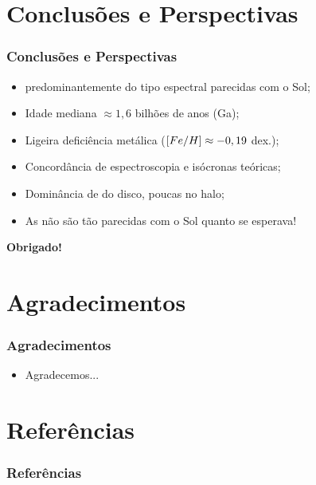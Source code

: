 \documentclass[10pt, aspectratio=169]{slidesiffmodelo}
\begin{document}
\section{Conclusões e Perspectivas}
\begin{frame}[t, allowframebreaks]
    \frametitle{Conclusões e Perspectivas}
    \begin{itemize}
        \item \estrela predominantemente do tipo espectral parecidas com o Sol;
        \item Idade mediana $\approx 1,6$ bilhões de anos (Ga);
        \item Ligeira deficiência metálica ($[Fe/H] \approx -0,19$ dex.);
        \item Concordância de espectroscopia e isócronas teóricas;
        \item Dominância de \estrela do disco, poucas \estrela no halo;
        \item As \estrela não são tão parecidas com o Sol quanto se esperava!
    \end{itemize}
\end{frame}

\begin{frame}[t]
    \begin{center}
        \vfill
        {\Huge \textbf{Obrigado!}} \\
        \vspace*{1em}
    \end{center}
\end{frame}

\section*{Agradecimentos}
\begin{frame}[t,small]
    \frametitle{Agradecimentos}
    \small
    \begin{itemize}
        \item Agradecemos...
    \end{itemize}   
\end{frame}

\section*{Referências}
\begin{frame}[allowframebreaks]
    \frametitle{Referências}   
    
\end{frame}
\end{document}
